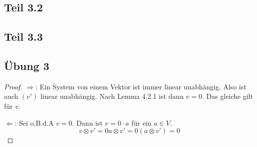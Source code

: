 \documentclass[10pt,a4paper]{article}
\begin{document}
\subsection*{Teil 3.2}

\subsection*{Teil 3.3}

\subsection*{Übung 3}

\begin{proof}
$\Rightarrow$: Ein System von einem Vektor ist immer linear unabhängig.
Also ist auch $(v')$ linear unabhängig.
Nach Lemma 4.2.1 ist dann $v = 0$.
Das gleiche gilt für $v$.

$\Leftarrow$: Sei o.B.d.A $v = 0$.
Dann ist $v = 0 \cdot a$ für ein $a \in V$.
\begin{equation}
v \otimes v' = 0a \otimes v' = 0(a \otimes v') = 0
\end{equation}
\end{proof}
\end{document}
